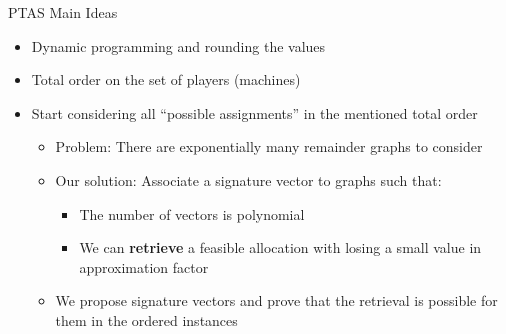 \begin{frame}[t]{PTAS Main Ideas}
    \begin{itemize}
        \item<2-> Dynamic programming and rounding the values 
        \item<3-> Total order on the set of players (machines)
        \item<4-> Start considering all ``possible assignments'' in the mentioned total order
            \begin{itemize}
                \item<5-> Problem: There are exponentially many \alert{remainder} graphs to consider
                \item<6-> Our solution: Associate a signature vector to graphs such that:
                    \begin{itemize}
                        \item<7-> The number of vectors is polynomial
                        \item<8-> We can \textbf{retrieve} a feasible allocation with losing a small value in approximation factor
                    \end{itemize}
                \item<9-> We \alert{propose} signature vectors and \alert{prove} that the retrieval is possible for them in the ordered instances
            \end{itemize}
    \end{itemize}
\end{frame}